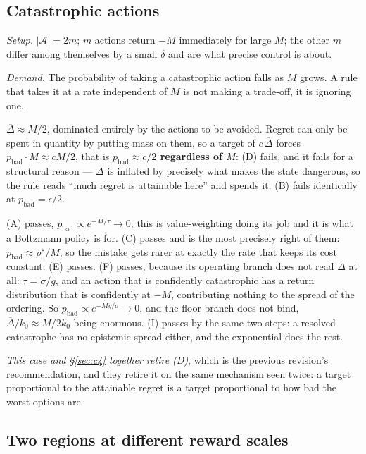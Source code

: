 \documentclass{article}
\newcommand{\actions}{\mathcal{A}}
\newcommand{\gapbar}{\overline{\Delta}}
\newcommand{\srank}{\sigma}
\begin{document}
\subsection{Catastrophic actions}
\label{sec:c2}

\emph{Setup.} $|\actions| = 2m$; $m$ actions return $-M$ immediately for large $M$; the other $m$
differ among themselves by a small $\delta$ and are what precise control is about.

\emph{Demand.} The probability of taking a catastrophic action falls as $M$ grows. A rule that
takes it at a rate independent of $M$ is not making a trade-off, it is ignoring one.

$\gapbar \approx M/2$, dominated entirely by the actions to be avoided. Regret can only be spent
in quantity by putting mass on them, so a target of $c\,\gapbar$ forces $p_{\mathrm{bad}}\cdot M
\approx c M/2$, that is \textbf{$p_{\mathrm{bad}} \approx c/2$ regardless of $M$}: (D) fails,
and it fails for a structural reason --- $\gapbar$ is inflated by precisely what makes the state
dangerous, so the rule reads ``much regret is attainable here'' and spends it. (B) fails
identically at $p_{\mathrm{bad}} = \epsilon/2$.

(A) passes, $p_{\mathrm{bad}} \propto e^{-M/\tau} \to 0$; this is value-weighting doing its job
and it is what a Boltzmann policy is for. (C) passes and is the most precisely right of them:
$p_{\mathrm{bad}} \approx \rho^\star/M$, so the mistake gets rarer at exactly the rate that keeps
its cost constant. (E) passes. (F) passes, because its operating branch does not read $\gapbar$
at all: $\tau = \srank/g$, and an action that is confidently catastrophic has a return
distribution that is confidently at $-M$, contributing nothing to the spread of the ordering. So
$p_{\mathrm{bad}} \propto e^{-Mg/\srank} \to 0$, and the floor branch does not bind,
$\gapbar/k_0 \approx M/2k_0$ being enormous. (I) passes by the same two steps: a resolved
catastrophe has no epistemic spread either, and the exponential does the rest.

\emph{This case and \S\ref{sec:c4} together retire (D)}, which is the previous revision's
recommendation, and they retire it on the same mechanism seen twice: a target proportional to the
attainable regret is a target proportional to how bad the worst options are.

\subsection{Two regions at different reward scales}
\label{sec:c5}
\end{document}
